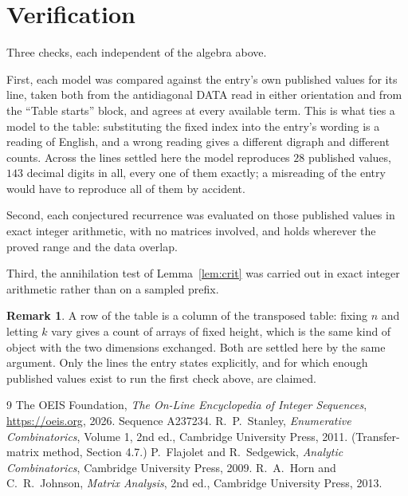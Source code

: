 \documentclass[11pt,a4paper]{article}
\theoremstyle{plain}
\theoremstyle{definition}
\newtheorem{remark}[theorem]{Remark}
\begin{document}
\section{Verification}

Three checks, each independent of the algebra above.

First, each model was compared against the entry's own published values for its line, taken
both from the antidiagonal DATA read in either orientation and from the ``Table starts''
block, and agrees at every available term. This is what ties a model to the table:
substituting the fixed index into the entry's wording is a reading of English, and a wrong
reading gives a different digraph and different counts. Across the lines settled here the
model reproduces $28$ published values, $143$ decimal digits in all, every one of
them exactly; a misreading of the entry would have to reproduce all of them by accident.

Second, each conjectured recurrence was evaluated on those published values in exact
integer arithmetic, with no matrices involved, and holds wherever the proved range and the
data overlap.

Third, the annihilation test of Lemma~\ref{lem:crit} was carried out in exact integer
arithmetic rather than on a sampled prefix.

\begin{remark}
A row of the table is a column of the transposed table: fixing $n$ and letting $k$ vary gives a
count of arrays of fixed height, which is the same kind of object with the two dimensions
exchanged. Both are settled here by the same argument. Only the lines the entry states
explicitly, and for which enough published values exist to run the first check above, are
claimed.
\end{remark}

\begin{thebibliography}{9}
 The OEIS Foundation, \emph{The On-Line Encyclopedia of Integer
Sequences}, \url{https://oeis.org}, 2026. Sequence A237234.
 R.~P.~Stanley, \emph{Enumerative Combinatorics}, Volume 1, 2nd ed.,
Cambridge University Press, 2011. (Transfer-matrix method, Section 4.7.)
 P.~Flajolet and R.~Sedgewick, \emph{Analytic Combinatorics}, Cambridge
University Press, 2009.
 R.~A.~Horn and C.~R.~Johnson, \emph{Matrix Analysis}, 2nd ed., Cambridge
University Press, 2013.
\end{thebibliography}
\end{document}
